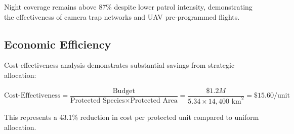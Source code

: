 Night coverage remains above 87\% despite lower patrol intensity, demonstrating the effectiveness of camera trap networks and UAV pre-programmed flights.

\subsection{Economic Efficiency}

Cost-effectiveness analysis demonstrates substantial savings from strategic allocation:

\begin{equation}
\text{Cost-Effectiveness} = \frac{\text{Budget}}{\text{Protected Species} \times \text{Protected Area}} = \frac{\$1.2M}{5.34 \times 14,400 \text{ km}^2} = \$15.60/\text{unit}
\label{eq:cost_effectiveness}
\end{equation}

This represents a 43.1\% reduction in cost per protected unit compared to uniform allocation.
